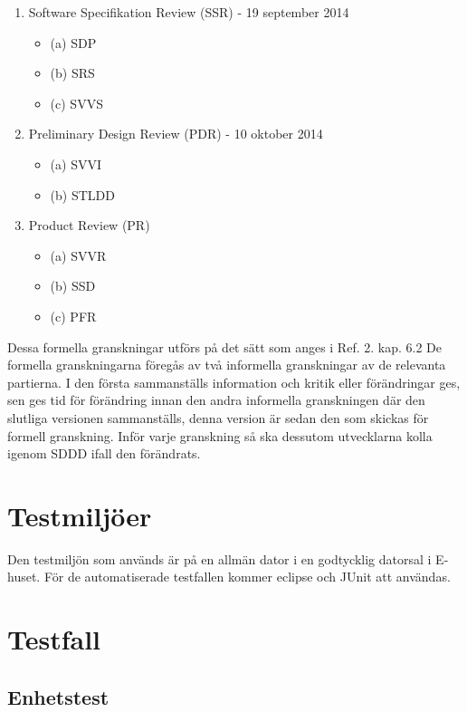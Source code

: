 \documentclass[a4paper]{article}
\begin{document}
\begin{enumerate}


\item Software Specifikation Review (SSR) - 19 september 2014
\begin{itemize}
\item [](a) SDP
\item [](b) SRS
\item [](c) SVVS
\end{itemize}


\item Preliminary Design Review (PDR) - 10 oktober 2014
\begin{itemize}
\item [](a) SVVI
\item [](b) STLDD
\end{itemize}


\item Product Review (PR)
\begin{itemize}
\item [](a) SVVR
\item [](b) SSD
\item [](c) PFR
\end{itemize}


\end{enumerate}

Dessa formella granskningar utförs på det sätt som anges i Ref. 2. kap. 6.2 De formella granskningarna föregås av två informella granskningar av de relevanta partierna. I den första sammanställs information och kritik eller förändringar ges, sen ges tid för förändring innan den andra informella granskningen där den slutliga versionen sammanställs, denna version är sedan den som skickas för formell granskning. Inför varje granskning så ska dessutom utvecklarna kolla igenom SDDD ifall den förändrats.


\section{Testmiljöer}

Den testmiljön som används är på en allmän dator i en godtycklig datorsal i E-huset. För de automatiserade testfallen kommer eclipse och JUnit att användas.

\section{Testfall}

\subsection{Enhetstest}
\end{document}
